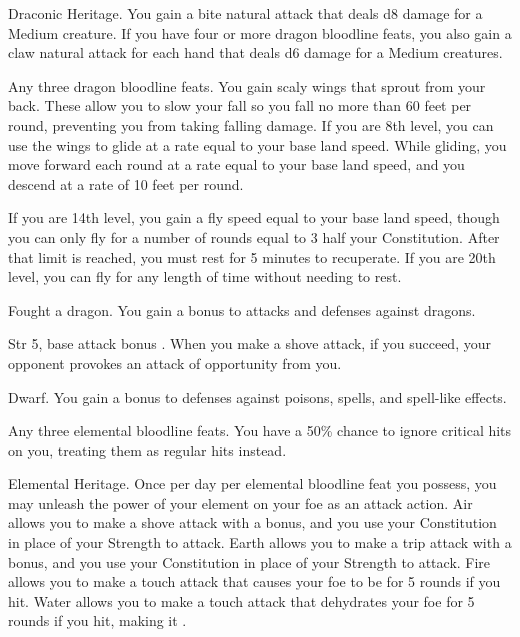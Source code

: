  Draconic Heritage.
 You gain a bite natural attack that deals d8 damage for a Medium creature. If you have four or more dragon bloodline feats, you also gain a claw natural attack for each hand that deals d6 damage for a Medium creatures.

 Any three dragon bloodline feats.
 You gain scaly wings that sprout from your back. These allow you to slow your fall so you fall no more than 60 feet per round, preventing you from taking falling damage. If you are 8th level, you can use the wings to glide at a rate equal to your base land speed. While gliding, you move forward each round at a rate equal to your base land speed, and you descend at a rate of 10 feet per round.

If you are 14th level, you gain a fly speed equal to your base land speed, though you can only fly for a number of rounds equal to 3 \add half your Constitution. After that limit is reached, you must rest for 5 minutes to recuperate. If you are 20th level, you can fly for any length of time without needing to rest.

\featpre Fought a dragon.
\featben You gain a  bonus to attacks and defenses against dragons.
\featspecial \featbanenotes

\featpre Str 5, base attack bonus .
\featben When you make a shove attack, if you succeed, your opponent provokes an attack of opportunity from you.

 Dwarf.
 You gain a  bonus to defenses against poisons, spells, and spell-like effects.

\featpre Any three elemental bloodline feats.
\featben You have a 50\% chance to ignore critical hits on you, treating them as regular hits instead.

\featpre Elemental Heritage.
\featben Once per day per elemental bloodline feat you possess, you may unleash the power of your element on your foe as an attack action. Air allows you to make a shove attack with a  bonus, and you use your Constitution in place of your Strength to attack. Earth allows you to make a trip attack with a  bonus, and you use your Constitution in place of your Strength to attack. Fire allows you to make a touch attack that causes your foe to be \ignited for 5 rounds if you hit. Water allows you to make a touch attack that dehydrates your foe for 5 rounds if you hit, making it \vulnerable.

